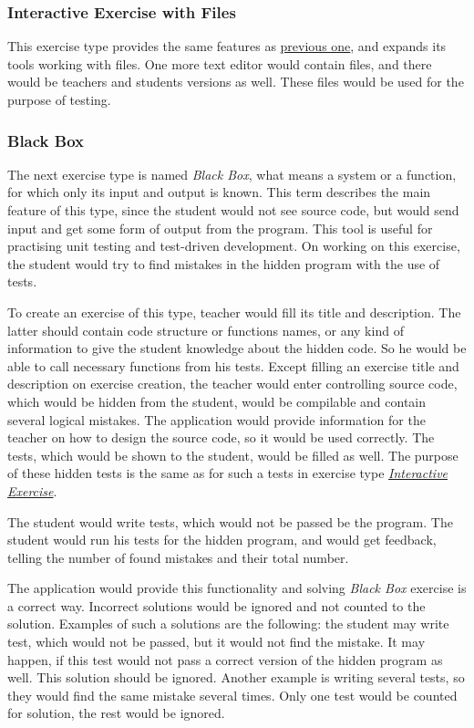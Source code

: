         
        \subsubsection{Interactive Exercise with Files}
        This exercise type provides the same features as \hyperref[subsubsec:whitebox]{previous one}, and expands its tools working with files. One more text editor would contain files, and there would be teachers and students versions as well. These files would be used for the purpose of testing.
        
        
        \subsubsection{Black Box}
        \label{subsubsec:blackbox}
        The next exercise type is named \textit{Black Box}, what means a system or a function, for which only its input and output is known. This term describes the main feature of this type, since the student would not see source code, but would send input and get some form of output from the program. This tool is useful for practising unit testing and test-driven development. On working on this exercise, the student would try to find mistakes in the hidden program with the use of tests.
        
        To create an exercise of this type, teacher would fill its title and description. The latter should contain code structure or functions names, or any kind of information to give the student knowledge about the hidden code. So he would be able to call necessary functions from his tests. Except filling an exercise title and description on exercise creation, the teacher would enter controlling source code, which would be hidden from the student, would be compilable and contain several logical mistakes. The application would provide information for the teacher on how to design the source code, so it would be used correctly. The tests, which would be shown to the student, would be filled as well. The purpose of these hidden tests is the same as for such a tests in exercise type \hyperref[subsubsec:whitebox]{\textit{Interactive Exercise}}.
        
        The student would write tests, which would not be passed be the program. The student would run his tests for the hidden program, and would get feedback, telling the number of found mistakes and their total number.
        
        The application would provide this functionality and solving \textit{Black Box} exercise is a correct way. Incorrect solutions would be ignored and not counted to the solution. Examples of such a solutions are the following: the student may write test, which would not be passed, but it would not find the mistake. It may happen, if this test would not pass a correct version of the hidden program as well. This solution should be ignored. Another example is writing several tests, so they would find the same mistake several times. Only one test would be counted for solution, the rest would be ignored.
        
